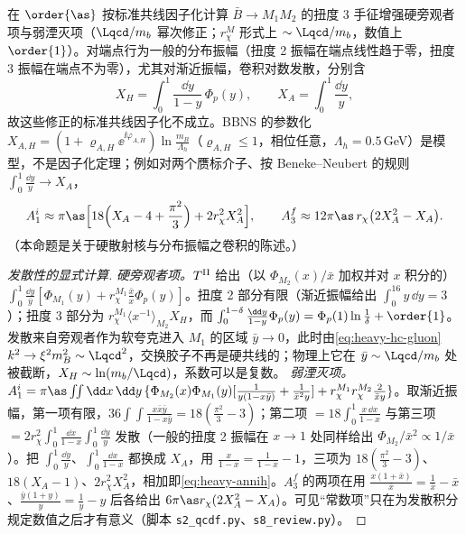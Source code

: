 \begin{proposition}\label{prop:heavy-qcdf-endpoint}
在 $\order{\as}$ 按标准共线因子化计算 $\bar B\to M_1M_2$ 的扭度 3 手征增强硬旁观者项与弱湮灭项（$\Lqcd/m_b$ 幂次修正；$r_\chi^M$ 形式上 $\sim\Lqcd/m_b$，数值上 $\order{1}$）。对端点行为一般的分布振幅（扭度 2 振幅在端点线性趋于零，扭度 3 振幅在端点不为零），尤其对渐近振幅，卷积对数发散，分别含
\begin{equation}\label{eq:heavy-XAXH}
X_H=\int_0^1\frac{\dd y}{1-y}\,\Phi_p(y),\qquad X_A=\int_0^1\frac{\dd y}{y},
\end{equation}
故这些修正的标准共线因子化不成立。BBNS 的参数化 $X_{A,H}=(1+\varrho_{A,H}\ee^{\ii\varphi_{A,H}})\ln\frac{m_B}{\Lambda_h}$（$\varrho_{A,H}\le1$，相位任意，$\Lambda_h=0.5$\,GeV）是模型，不是因子化定理；例如对两个赝标介子、按 Beneke--Neubert 的规则 $\int_0^1\frac{\dd y}{y}\to X_A$\cite[式~(56)]{BenekeNeubert2003}，
\begin{equation}\label{eq:heavy-annih}
A_1^i\approx\pi\as\Big[18\Big(X_A-4+\frac{\pi^2}{3}\Big)+2r_\chi^2X_A^2\Big],\qquad A_3^f\approx12\pi\as\,r_\chi\big(2X_A^2-X_A\big).
\end{equation}
（本命题是关于硬散射核与分布振幅之卷积的陈述。）
\end{proposition}

\begin{proof}[发散性的显式计算]
\emph{硬旁观者项。}$T^{\rm II}$ 给出（以 $\Phi_{M_2}(x)/\bar x$ 加权并对 $x$ 积分的）$\int_0^1\frac{\dd y}{\bar y}[\Phi_{M_1}(y)+r_\chi^{M_1}\frac{\bar x}{x}\Phi_p(y)]$\cite[式~(57)]{BenekeEtAl2001}。扭度 2 部分有限（渐近振幅给出 $\int_0^16y\,\dd y=3$）；扭度 3 部分为 $r_\chi^{M_1}\langle x^{-1}\rangle_{M_2}X_H$，而 $\int_0^{1-\delta}\frac{\dd y}{1-y}\Phi_p(y)=\Phi_p(1)\ln\frac1\delta+\order{1}$。发散来自旁观者作为软夸克进入 $M_1$ 的区域 $\bar y\to0$，此时由\cref{eq:heavy-hc-gluon} $k^2\to\xi^2m_B^2\sim\Lqcd^2$，交换胶子不再是硬共线的；物理上它在 $\bar y\sim\Lqcd/m_b$ 处被截断，$X_H\sim\ln(m_b/\Lqcd)$，系数可以是复数\cite{BenekeEtAl2001}。
\emph{弱湮灭项。}$A_1^i=\pi\as\int\!\!\int\dd x\,\dd y\,\{\Phi_{M_2}(x)\Phi_{M_1}(y)[\frac{1}{y(1-x\bar y)}+\frac{1}{\bar x^2y}]+r_\chi^{M_1}r_\chi^{M_2}\frac{2}{\bar xy}\}$\cite[式~(62)]{BenekeEtAl2001}。取渐近振幅，第一项有限，$36\int\!\!\int\frac{x\bar x\bar y}{1-x\bar y}=18(\frac{\pi^2}{3}-3)$；第二项 $=18\int_0^1\frac{x\,\dd x}{1-x}$ 与第三项 $=2r_\chi^2\int_0^1\frac{\dd x}{1-x}\int_0^1\frac{\dd y}{y}$ 发散（一般的扭度 2 振幅在 $x\to1$ 处同样给出 $\Phi_{M_2}/\bar x^2\propto1/\bar x$）。把 $\int_0^1\frac{\dd y}{y}$、$\int_0^1\frac{\dd x}{1-x}$ 都换成 $X_A$，用 $\frac{x}{1-x}=\frac1{1-x}-1$，三项为 $18(\frac{\pi^2}{3}-3)$、$18(X_A-1)$、$2r_\chi^2X_A^2$，相加即\cref{eq:heavy-annih}。$A_3^f$ 的两项\cite[式~(62)]{BenekeEtAl2001}在用 $\frac{x(1+\bar x)}{\bar x}=\frac{1}{\bar x}-\bar x$、$\frac{\bar y(1+y)}{y}=\frac1y-y$ 后各给出 $6\pi\as r_\chi(2X_A^2-X_A)$。可见“常数项”只在为发散积分规定数值之后才有意义（脚本 \texttt{s2\_\allowbreak qcdf.py}、\texttt{s8\_\allowbreak review.py}）。
\end{proof}

